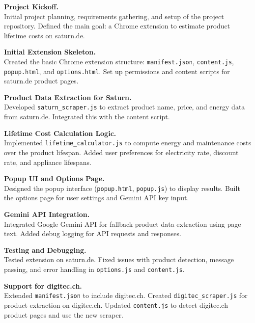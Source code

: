 \documentclass{article}
\begin{document}
\begin{description}[leftmargin=!,labelwidth=2.5cm]

\item[02.04.2025] 
\textbf{Project Kickoff.} \\ 
Initial project planning, requirements gathering, and setup of the project repository. Defined the main goal: a Chrome extension to estimate product lifetime costs on saturn.de.

\item[05.04.2025] 
\textbf{Initial Extension Skeleton.} \\ 
Created the basic Chrome extension structure: \texttt{manifest.json}, \texttt{content.js}, \texttt{popup.html}, and \texttt{options.html}. Set up permissions and content scripts for saturn.de product pages.

\item[10.04.2025] 
\textbf{Product Data Extraction for Saturn.} \\ 
Developed \texttt{saturn_scraper.js} to extract product name, price, and energy data from saturn.de. Integrated this with the content script.

\item[15.04.2025] 
\textbf{Lifetime Cost Calculation Logic.} \\ 
Implemented \texttt{lifetime_calculator.js} to compute energy and maintenance costs over the product lifespan. Added user preferences for electricity rate, discount rate, and appliance lifespans.

\item[20.04.2025] 
\textbf{Popup UI and Options Page.} \\ 
Designed the popup interface (\texttt{popup.html}, \texttt{popup.js}) to display results. Built the options page for user settings and Gemini API key input.

\item[25.04.2025] 
\textbf{Gemini API Integration.} \\ 
Integrated Google Gemini API for fallback product data extraction using page text. Added debug logging for API requests and responses.

\item[28.04.2025] 
\textbf{Testing and Debugging.} \\ 
Tested extension on saturn.de. Fixed issues with product detection, message passing, and error handling in \texttt{options.js} and \texttt{content.js}.

\item[01.05.2025] 
\textbf{Support for digitec.ch.} \\ 
Extended \texttt{manifest.json} to include digitec.ch. Created \texttt{digitec_scraper.js} for product extraction on digitec.ch. Updated \texttt{content.js} to detect digitec.ch product pages and use the new scraper.


\end{description}
\end{document}
